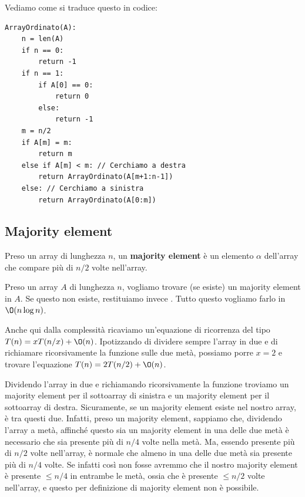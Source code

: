 \documentclass[11pt, a4paper, titlepage, oneside]{scrbook}
\begin{document}
Vediamo come si traduce questo in codice:
\begin{lstlisting}
ArrayOrdinato(A):
    n = len(A)
    if n == 0:
        return -1
    if n == 1:
        if A[0] == 0:
            return 0
        else:
            return -1
    m = n/2
    if A[m] = m:
        return m
    else if A[m] < m: // Cerchiamo a destra
        return ArrayOrdinato(A[m+1:n-1])
    else: // Cerchiamo a sinistra
        return ArrayOrdinato(A[0:m])
\end{lstlisting}

\subsection{Majority element}

\begin{Definizione}
\label{def-majority-element}
Preso un array di lunghezza $n$, un \textbf{majority element} è un elemento $\alpha$ dell'array che compare più di $n/2$ volte nell'array.
\end{Definizione}

Preso un array $A$ di lunghezza $n$, vogliamo trovare (se esiste) un majority element in $A$. Se questo non esiste, restituiamo invece . Tutto questo vogliamo farlo in $\O(n \log n)$.

Anche qui dalla complessità ricaviamo un'equazione di ricorrenza del tipo $T(n) = xT(n/x) + \O(n)$. Ipotizzando di dividere sempre l'array in due e di richiamare ricorsivamente la funzione sulle due metà, possiamo porre $x = 2$ e trovare l'equazione $T(n) = 2 T(n/2) + \O(n)$.

Dividendo l'array in due e richiamando ricorsivamente la funzione troviamo un majority element  per il sottoarray di sinistra e un majority element  per il sottoarray di destra. Sicuramente, se un majority element esiste nel nostro array, è tra questi due. Infatti, preso un majority element, sappiamo che, dividendo l'array a metà, affinché questo sia un majority element in una delle due metà è necessario che sia presente più di $n/4$ volte nella metà. Ma, essendo presente più di $n/2$ volte nell'array, è normale che almeno in una delle due metà sia presente più di $n/4$ volte. Se infatti così non fosse avremmo che il nostro majority element è presente $\leq n/4$ in entrambe le metà, ossia che è presente $\leq n/2$ volte nell'array, e questo per definizione di majority element non è possibile.
\end{document}

